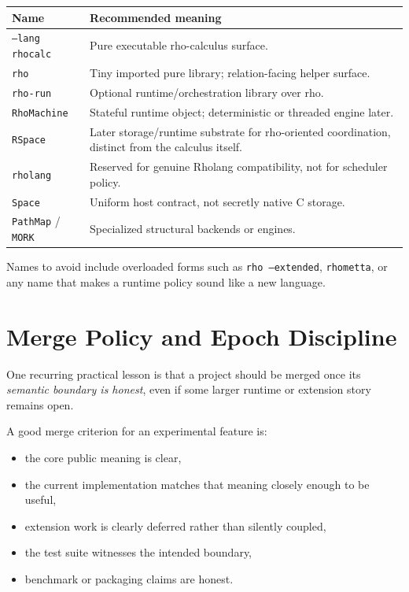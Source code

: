 \documentclass[11pt]{article}
\newcommand{\code}[1]{\texttt{#1}}
\newcommand{\strong}[1]{\textbf{#1}}
\begin{document}
\begin{longtable}{>{\raggedright\arraybackslash}p{} p{}}
\toprule
\strong{Name} & \strong{Recommended meaning} \\
\midrule
\endhead
\code{--lang rhocalc} & Pure executable rho-calculus surface. \\
\code{rho} & Tiny imported pure library; relation-facing helper surface. \\
\code{rho-run} & Optional runtime/orchestration library over rho. \\
\code{RhoMachine} & Stateful runtime object; deterministic or threaded engine later. \\
\code{RSpace} & Later storage/runtime substrate for rho-oriented coordination, distinct from the calculus itself. \\
\code{rholang} & Reserved for genuine Rholang compatibility, not for scheduler policy. \\
\code{Space} & Uniform host contract, not secretly native C storage. \\
\code{PathMap} / \code{MORK} & Specialized structural backends or engines. \\
\bottomrule
\end{longtable}

Names to avoid include overloaded forms such as \code{rho --extended}, \code{rhometta}, or any name that makes a runtime policy sound like a new language.

\section{Merge Policy and Epoch Discipline}

One recurring practical lesson is that a project should be merged once its \emph{semantic boundary is honest}, even if some larger runtime or extension story remains open.

A good merge criterion for an experimental feature is:

\begin{itemize}
  \item the core public meaning is clear,
  \item the current implementation matches that meaning closely enough to be useful,
  \item extension work is clearly deferred rather than silently coupled,
  \item the test suite witnesses the intended boundary,
  \item benchmark or packaging claims are honest.
\end{itemize}
\end{document}
